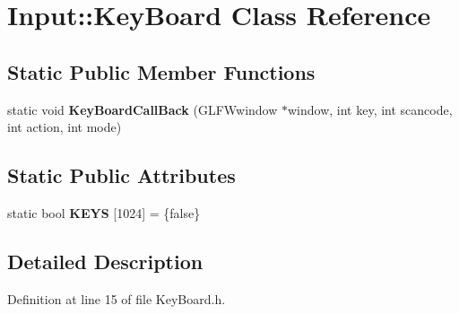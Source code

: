 \hypertarget{class_input_1_1_key_board}{}\section{Input\+:\+:Key\+Board Class Reference}
\label{class_input_1_1_key_board}
\subsection*{Static Public Member Functions}
\begin{DoxyCompactItemize}
\item 
static void {\bfseries Key\+Board\+Call\+Back} (G\+L\+F\+Wwindow $\ast$window, int key, int scancode, int action, int mode)\hypertarget{class_input_1_1_key_board_ae87cac631316b7c7f2e7f37c0b3b4b40}{}\label{class_input_1_1_key_board_ae87cac631316b7c7f2e7f37c0b3b4b40}

\end{DoxyCompactItemize}
\subsection*{Static Public Attributes}
\begin{DoxyCompactItemize}
\item 
static bool {\bfseries K\+E\+YS} \mbox{[}1024\mbox{]} = \{false\}\hypertarget{class_input_1_1_key_board_a6c2c9067a6ed773f57143cfe81abba12}{}\label{class_input_1_1_key_board_a6c2c9067a6ed773f57143cfe81abba12}

\end{DoxyCompactItemize}


\subsection{Detailed Description}


Definition at line 15 of file Key\+Board.\+h.

